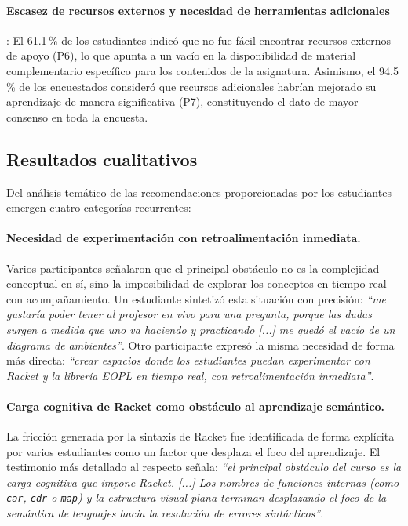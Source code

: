 \paragraph{Escasez de recursos externos y necesidad de herramientas adicionales}: El {61.1\,\%} de los estudiantes indicó que no fue fácil encontrar recursos externos de apoyo (P6), lo que apunta a un vacío en la disponibilidad de material complementario específico para los contenidos de la asignatura. Asimismo, el {94.5\,\%} de los encuestados consideró que recursos adicionales habrían mejorado su aprendizaje de manera significativa (P7), constituyendo el dato de mayor consenso en toda la encuesta.

\subsection{Resultados cualitativos}

Del análisis temático de las recomendaciones proporcionadas por los estudiantes emergen cuatro categorías recurrentes:

\paragraph{Necesidad de experimentación con retroalimentación inmediata.}
Varios participantes señalaron que el principal obstáculo no es la complejidad conceptual en sí, sino la imposibilidad de explorar los conceptos en tiempo real con acompañamiento. Un estudiante sintetizó esta situación con precisión: \textit{``me gustaría poder tener al profesor en vivo para una pregunta, porque las dudas surgen a medida que uno va haciendo y practicando [...] me quedó el vacío de un diagrama de ambientes''}. Otro participante expresó la misma necesidad de forma más directa: \textit{``crear espacios donde los estudiantes puedan experimentar con Racket y la librería EOPL en tiempo real, con retroalimentación inmediata''}.

\paragraph{Carga cognitiva de Racket como obstáculo al aprendizaje semántico.}
La fricción generada por la sintaxis de Racket fue identificada de forma explícita por varios estudiantes como un factor que desplaza el foco del aprendizaje. El testimonio más detallado al respecto señala: \textit{``el principal obstáculo del curso es la carga cognitiva que impone Racket. [...] Los nombres de funciones internas (como \texttt{car}, \texttt{cdr} o \texttt{map}) y la estructura visual plana terminan desplazando el foco de la semántica de lenguajes hacia la resolución de errores sintácticos''}.


